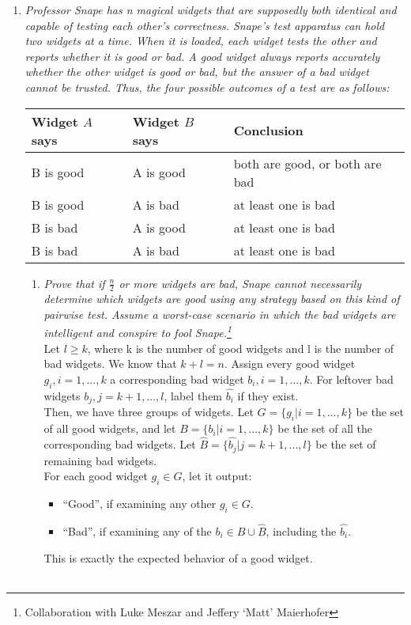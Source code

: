 \documentclass[12pt]{article}
\begin{document}
\begin{enumerate}
    
    \newpage
    \item \textit{Professor Snape has n magical widgets that are supposedly both identical and capable of testing each other's correctness. Snape's test apparatus can hold two widgets at a time. When it is loaded, each widget tests 
the other and reports whether it is good or bad. A good widget always reports accurately whether the other widget is good or bad, but the answer of a bad widget cannot be trusted. Thus, the four possible outcomes of a test are as 
follows:}
    \begin{center}
	    \begin{tabular}{l l l}
    		Widget $A$ says & Widget $B$ says & Conclusion \\
            \hline
            B is good & A is good & both are good, or both are bad \\
            B is good & A is bad & at least one is bad \\
            B is bad & A is good & at least one is bad \\
            B is bad & A is bad & at least one is bad \\
    	\end{tabular}
    \end{center}
    \begin{enumerate}
    \item \textit{Prove that if $\frac{n}{2}$ or more widgets are bad, Snape cannot necessarily determine which widgets are good using any strategy based on this kind of pairwise test. Assume a worst-case scenario in which the bad 
widgets are intelligent and conspire to fool Snape.\footnote{Collaboration with Luke Meszar and Jeffery `Matt' Maierhofer}} \\
    
    Let $l\geq k$, where k is the number of good widgets and l is the number of bad widgets. We know that $k+l=n$. Assign every good widget $g_i, i=1,...,k$ a corresponding bad widget $b_i, i=1,...,k$. For leftover bad widgets 
$b_j, j=k+1,...,l$, label them $\hat{b_i}$ if they exist.\\
    
    Then, we have three groups of widgets. Let $G = \{g_i | i=1,...,k\}$ be the set of all good widgets, and let $B = \{b_i | i=1,...,k\}$ be the set of all the corresponding bad widgets. Let $\hat{B} = \{\hat{b_j} | j=k+1,...,l\}$ 
be the set of remaining bad widgets.\\
    
    For each good widget $g_i \in G$, let it output: 
    \begin{itemize}
    \item ``Good'', if examining any other $g_i \in G$.
    \item ``Bad'', if examining any of the $b_i \in B\cup \hat{B}$, including the $\hat{b_i}$.
    \end{itemize}
    This is exactly the expected behavior of a good widget.\\\\
    

\end{enumerate}
\end{enumerate}
\end{document}
